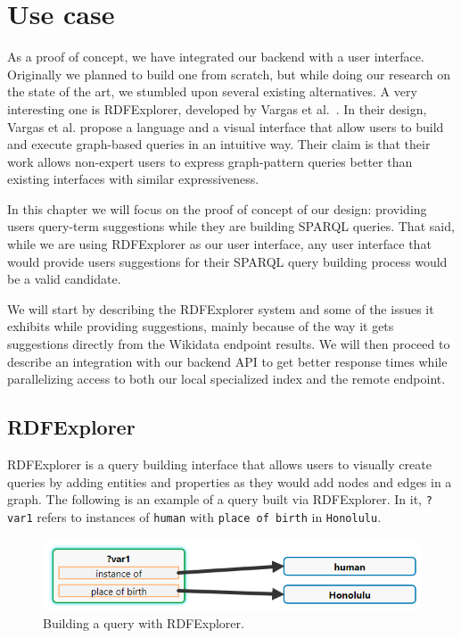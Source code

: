 \chapter{Use case}
\label{chap:Frontend}

As a proof of concept, we have integrated our backend with a user interface. 
Originally we planned to build one from scratch, but while doing our research on the state of the art, we stumbled upon several existing alternatives. 
A very interesting one is RDFExplorer, developed by Vargas et al.~\cite{Vargas2019}. 
In their design, Vargas et al. propose a language and a visual interface that allow users to build and execute graph-based queries in an intuitive way. 
Their claim is that their work allows non-expert users to express graph-pattern queries better than existing interfaces with similar expressiveness. 

In this chapter we will focus on the proof of concept of our design: 
providing users query-term suggestions while they are building SPARQL queries. 
That said, while we are using RDFExplorer as our user interface, any user interface that would provide users suggestions for their SPARQL query building process would be a valid candidate.

We will start by describing the RDFExplorer system and some of the issues it exhibits while providing suggestions, mainly because of the way it gets suggestions directly from the Wikidata endpoint results. 
We will then proceed to describe an integration with our backend API to get better response times while parallelizing access to both our local specialized index and the remote endpoint.

\section{RDFExplorer}

RDFExplorer is a query building interface that allows users to visually create queries by adding entities and properties as they would add nodes and edges in a graph. The following is an example of a query built via RDFExplorer. In it, \texttt{?var1} refers to instances of \texttt{human} with \texttt{place of birth} in \texttt{Honolulu}.

\begin{figure}[h]
    \centering
        \includegraphics[width=.8\linewidth]{imagenes/rdfExplorer1.png}
        \caption{Building a query with RDFExplorer.}
        \label{fig:rdfExplorer1}
\end{figure}

